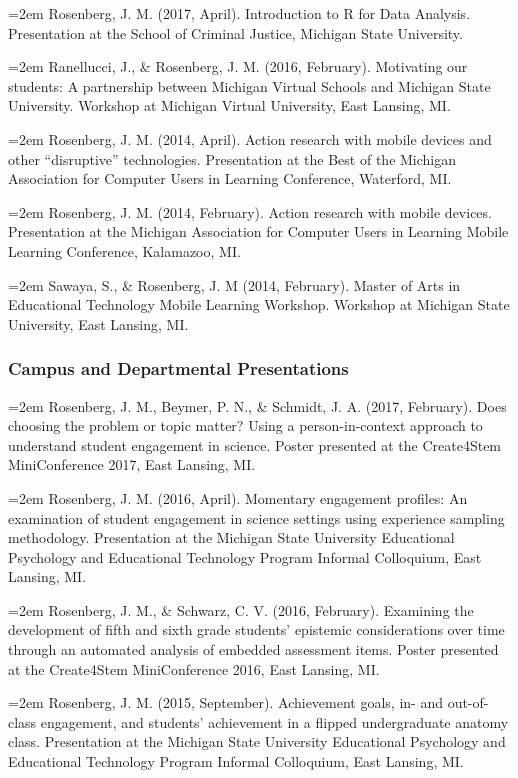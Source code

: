 \documentclass[]{article}
\begin{document}
\hangindent=2em Rosenberg, J. M. (2017, April). Introduction to R for
Data Analysis. Presentation at the School of Criminal Justice, Michigan
State University.

\hangindent=2em Ranellucci, J., \& Rosenberg, J. M. (2016, February).
Motivating our students: A partnership between Michigan Virtual Schools
and Michigan State University. Workshop at Michigan Virtual University,
East Lansing, MI.

\hangindent=2em Rosenberg, J. M. (2014, April). Action research with
mobile devices and other ``disruptive'' technologies. Presentation at
the Best of the Michigan Association for Computer Users in Learning
Conference, Waterford, MI.

\hangindent=2em Rosenberg, J. M. (2014, February). Action research with
mobile devices. Presentation at the Michigan Association for Computer
Users in Learning Mobile Learning Conference, Kalamazoo, MI.

\hangindent=2em Sawaya, S., \& Rosenberg, J. M (2014, February). Master
of Arts in Educational Technology Mobile Learning Workshop. Workshop at
Michigan State University, East Lansing, MI.

\subsubsection{Campus and Departmental
Presentations}\label{campus-and-departmental-presentations}

\hangindent=2em Rosenberg, J. M., Beymer, P. N., \& Schmidt, J. A.
(2017, February). Does choosing the problem or topic matter? Using a
person-in-context approach to understand student engagement in science.
Poster presented at the Create4Stem MiniConference 2017, East Lansing,
MI.

\hangindent=2em Rosenberg, J. M. (2016, April). Momentary engagement
profiles: An examination of student engagement in science settings using
experience sampling methodology. Presentation at the Michigan State
University Educational Psychology and Educational Technology Program
Informal Colloquium, East Lansing, MI.

\hangindent=2em Rosenberg, J. M., \& Schwarz, C. V. (2016, February).
Examining the development of fifth and sixth grade students' epistemic
considerations over time through an automated analysis of embedded
assessment items. Poster presented at the Create4Stem MiniConference
2016, East Lansing, MI.

\hangindent=2em Rosenberg, J. M. (2015, September). Achievement goals,
in- and out-of-class engagement, and students' achievement in a flipped
undergraduate anatomy class. Presentation at the Michigan State
University Educational Psychology and Educational Technology Program
Informal Colloquium, East Lansing, MI.
\end{document}
